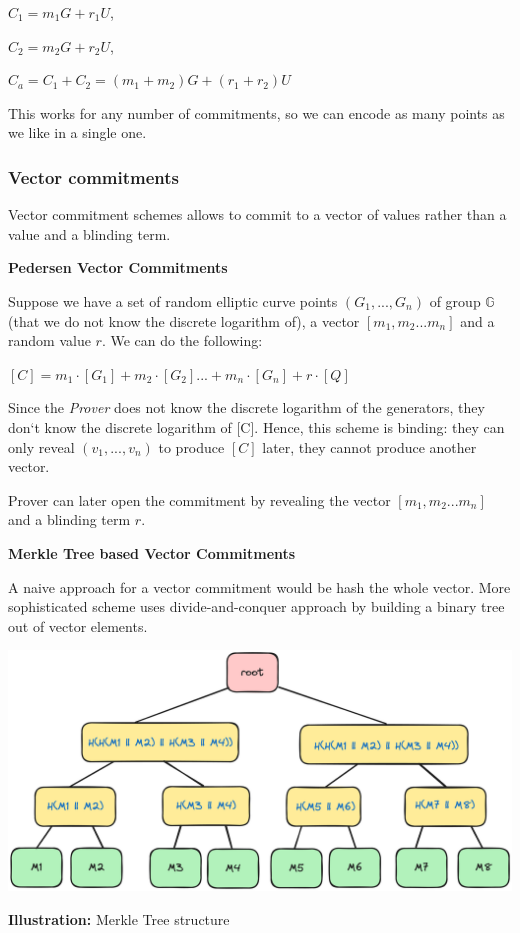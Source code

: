 \documentclass[../lecture-notes.tex]{subfiles}
\begin{document}
\begin{center}
    $C_1 = m_1G + r_1U$,

    $C_2 = m_2G + r_2U$,

    $C_a = C_1 + C_2 = (m_1 + m_2)G + (r_1 + r_2)U$
\end{center}

This works for any number of commitments, so we can encode as many points as we like in a single one.

\vspace{0.5 cm}

\subsubsection{Vector commitments}

Vector commitment schemes allows to commit to a vector of values rather than a value and a blinding term.

\vspace{0.5 cm}

\textbf{Pedersen Vector Commitments}

Suppose we have a set of random elliptic curve points $(G_1,...,G_n)$ of group $\mathbb{G}$ 
(that we do not know the discrete logarithm of), a vector $[m_1, m_2 ... m_n]$ and a random value $r$. We can do the following:

\begin{center}
    $ [C] = m_1\cdot[G_1] + m_2 \cdot [G_2] ... + m_n \cdot [G_n] + r \cdot [Q]$ 
\end{center}

Since the \textit{Prover} does not know the discrete logarithm of the generators, they don`t know the discrete logarithm of [C]. Hence, this scheme is binding: they can only reveal $(v_1,...,v_n)$ to produce $[C]$ later, they cannot produce another vector.

Prover can later open the commitment by revealing the vector $[m_1, m_2 ... m_n]$ and a blinding term $r$.

\vspace{0.5 cm}

\textbf{Merkle Tree based Vector Commitments}

A naive approach for a vector commitment would be hash the whole vector. More sophisticated scheme uses divide-and-conquer approach by building a binary tree out of vector elements.

\begin{center}
    \centering\includegraphics[width=0.9\linewidth, clip]{images/lecture_5/MerkleTree.png}

    \scriptsize{\textbf{Illustration:} Merkle Tree structure}
\end{center}
\end{document}
